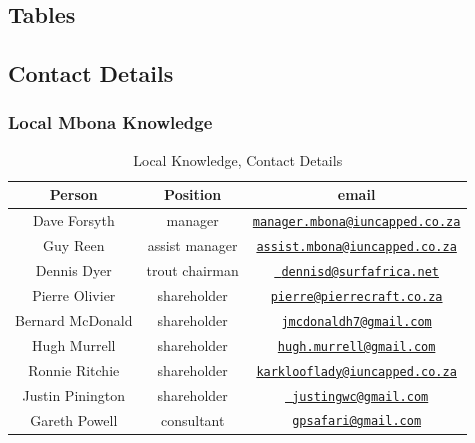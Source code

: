\begin{appendices}

\chapter{Tables}

\section{Contact Details}

\subsection{Local Mbona Knowledge}

\begin{table}[H]
  \centering
  \begin{tabular}{|c|c|c|}
    \hline
       Person & Position & email  \\ \hline
       Dave Forsyth & manager & \href{mailto:manager.mbona@iuncapped.co.za}{\nolinkurl{manager.mbona@iuncapped.co.za}} \\ \hline
       Guy Reen & assist manager & \href{mailto:assist.mbona@iuncapped.co.za}{\nolinkurl{assist.mbona@iuncapped.co.za}} \\ \hline
       Dennis Dyer & trout chairman & \href{mailto: dennisd@surfafrica.net}{\nolinkurl{ dennisd@surfafrica.net}} \\ \hline 
       Pierre Olivier & shareholder & \href{mailto:pierre@pierrecraft.co.za}{\nolinkurl{pierre@pierrecraft.co.za}} \\ \hline
       Bernard McDonald & shareholder & \href{mailto:jmcdonaldh7@gmail.com}{\nolinkurl{jmcdonaldh7@gmail.com}} \\ \hline
       Hugh Murrell & shareholder & \href{mailto:hugh.murrell@gmail.com}{\nolinkurl{hugh.murrell@gmail.com}} \\ \hline
       Ronnie Ritchie & shareholder & \href{mailto:karklooflady@iuncapped.co.za}{\nolinkurl{karklooflady@iuncapped.co.za}} \\ \hline
       Justin Pinington & shareholder & \href{mailto: justingwc@gmail.com}{\nolinkurl{ justingwc@gmail.com}} \\ \hline      
       Gareth Powell & consultant & \href{mailto:gpsafari@gmail.com}{\nolinkurl{gpsafari@gmail.com}} \\ \hline
     \end{tabular} 
     \caption{Local Knowledge, Contact Details}
  \label{tab:LocalKnowledgeContactDetails}
\end{table}


\end{appendices}
